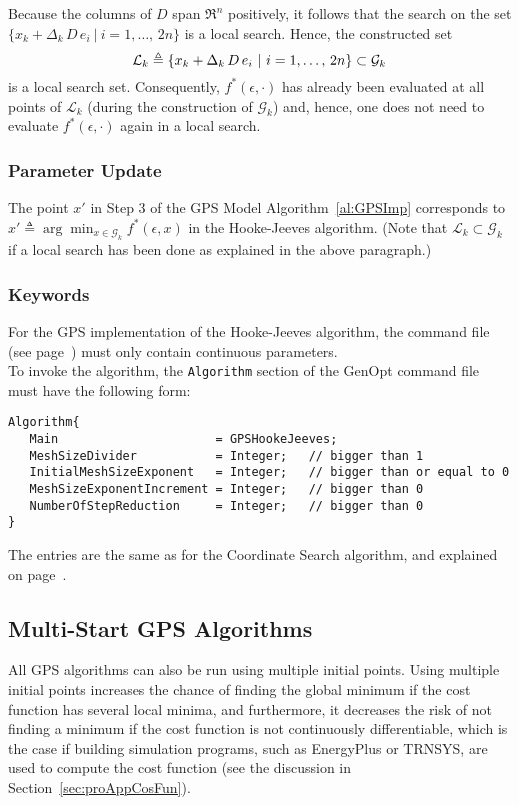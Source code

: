 Because the columns of 
$D$ span $\Re^n$ positively, it follows that
the search on the set  $\{ x_k + \Delta_k \, D \, e_i \ | \ i = 1, \ldots , \, 2 n
\}$ is a local search. Hence, the constructed set
\begin{equation}
\mathcal L_k \triangleq \{ x_k + \Delta_k \, D \, e_i \ | \
i = 1, \ldots , \, 2 n \} \subset \mathcal G_k
\lab{eq:LkHJ}
\end{equation}
is a local search set.
Consequently, $f^*(\epsilon,\cdot)$ has already been evaluated
at all points of $\mathcal L_k$ (during the construction of $\mathcal
G_k$) and, hence, one does not need to evaluate $f^*(\epsilon,\cdot)$ 
again in a local search.

\subsubsection{Parameter Update}
The point $x'$ in Step 3 of the GPS Model Algorithm~\ref{al:GPSImp} 
corresponds to $x' \triangleq \arg \min_{x \in \mathcal G_k} 
f^*(\epsilon,x)$ in the Hooke-Jeeves algorithm. (Note that 
$\mathcal L_k \subset \mathcal G_k$ if a local search has been done as
explained in the above paragraph.)

\subsubsection{Keywords}
For the GPS implementation of the Hooke-Jeeves algorithm, the command file (see page~\pageref{par:comFil}) must only contain continuous parameters.\\

To invoke the algorithm, 
the \texttt{Algorithm} section of the GenOpt command file must have the following form:
\label{algSec:GPSHookeJeeves}
\begin{lstlisting}
Algorithm{
   Main                      = GPSHookeJeeves;
   MeshSizeDivider           = Integer;   // bigger than 1
   InitialMeshSizeExponent   = Integer;   // bigger than or equal to 0
   MeshSizeExponentIncrement = Integer;   // bigger than 0
   NumberOfStepReduction     = Integer;   // bigger than 0
}
\end{lstlisting}
The entries are the same as for the Coordinate Search algorithm, and explained
on page~\pageref{sec:GPSCooSeaKeyWor}.


\subsection{Multi-Start GPS Algorithms}
All GPS algorithms can also be run using multiple initial points.
Using multiple initial points increases the chance of finding 
the global minimum if the cost function has several local minima,
and furthermore, it decreases the risk of not finding a minimum if the
cost function is not continuously differentiable, which 
is the case if building simulation programs, such as
EnergyPlus or TRNSYS, are used to compute the cost function
(see the discussion in Section~\ref{sec:proAppCosFun}).\\


